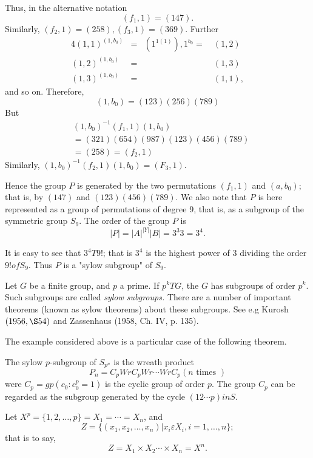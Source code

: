 Thus, in the alternative notation
$$
(f_1,  1) = (147).
$$
Similarly, $(f_2, 1) = (258), (f_3, 1) = (369)$. Further
\begin{alignat*}{4}
  (1, 1)^{(1,b_0)} & = &(1^{1(1)}), 1^{b_0} = ~&(1,2) \\
  (1,2)^{(1,b_0)}  & = && (1,3) \\
  (1,3)^{(1,b_0)}  & = & & (1,1),
\end{alignat*}
and so on.  Therefore, 
$$
(1, b_0) = (123) (256) (789)
$$
But
\begin{align*}
  & (1, b_0)^{-1} (f_1,  1) (1, b_0)\\
  & = (321) (654) (987) (123) (456) (789) \\
  & = (258) = (f_2,  1)
\end{align*}
Similarly, $(1, b_0)^{-1} (f_2,  1) (1, b_0) = (F_3, 1)$.

Hence the group $P$ is generated by the two permutations $(f_1, 1)$
and $(a, b_0)$; that is, by $(147)$ and $(123) (456) (789)$. We also
note that $P$ is here represented as a group of permutations of degree
$9$, that is, as a subgroup of the symmetric group $S_9$. The order of
the group $P$ is  
$$
|P| = |A|^{|Y|} |B| = 3^3 3 = 3^4.
$$

It is easy to see that $3^4 T 9 !$; that is $3^4$ is the highest power
of $3$ dividing the order $9 ! of S_9$. Thus $P$ is a "sylow subgroup"
of $S_9$. 

Let $G$ be a finite group, and $p$ a prime. If $p^k T G$, the $G$ has
subgroups of order $p^k$. Such subgroups are called \textit{sylow
  subgroups.} There are a number of important theorems (known as sylow
theorems) about these subgroups. See e.g Kurosh $(1956,  \S 54)$ and
Zassenhaus (1958, Ch. IV, p. 135). 

The example considered above is a particular case of the following theorem.

\begin{Theorem}[Kaloujnine, 1948]%
  The sylow $p$-subgroup of $S_{p^n}$ is the wreath product
  $$
  P_n = C_p Wr C_p Wr \cdots Wr C_p (n \text{ times })
  $$
  were $C_p = gp (c_0 : c^p_0 = 1)$ is the cyclic group of order
  $p$. The group $C_p$ can be regarded as the subgroup generated by
  the cycle $(12 \cdots p) in S$. 
\end{Theorem}

Let $X^p = \{ 1, 2,  \ldots,  p\} = X_1 = \cdots = X_n $, and
$$
Z = \bigg\{(x_1, x_2, \ldots,  x_n) \bigg| x_i \varepsilon X_i, i = 1,
\ldots, n  \bigg\}; 
$$
that is to say,
$$
Z = X_1 \times X_2 \cdots \times X_n = X^n.
$$

